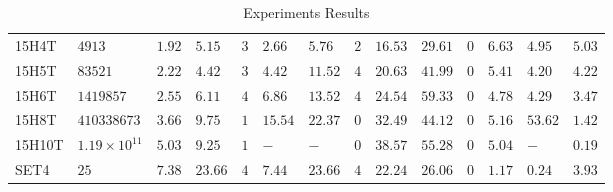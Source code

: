 \begin{center}
\begin{table}[]
\begin{adjustwidth}{-1in}{-1in}
\begin{tabular}{|ll|lll|lll|lll|lll|}
15H4T & $4913             $ & $1.92$ & $5.15 $ & $3 $  & $2.66 $ & $5.76 $ & $2 $  & $16.53$  & $29.61$  & $0$   & $6.63 $ & $4.95 $ & $5.03 $ \\
15H5T & $83521            $ & $2.22$ & $4.42 $ & $3 $  & $4.42 $ & $11.52$ & $4 $  & $20.63$  & $41.99$  & $0$   & $5.41 $ & $4.20 $ & $4.22 $ \\
15H6T & $1419857          $ & $2.55$ & $6.11 $ & $4 $  & $6.86 $ & $13.52$ & $4 $  & $24.54$  & $59.33$  & $0$   & $4.78 $ & $4.29 $ & $3.47 $ \\
15H8T & $410338673        $ & $3.66$ & $9.75 $ & $1 $  & $15.54$ & $22.37$ & $0 $  & $32.49$  & $44.12$  & $0$   & $5.16 $ & $53.62$ & $1.42 $ \\
15H10T& $1.19\times10^{11}$ & $5.03$ & $9.25 $ & $1 $  & $-    $ & $-    $ & $0 $  & $38.57$  & $55.28$  & $0$   & $5.04 $ & $-    $ & $0.19 $ \\
SET4  & $25               $ & $7.38$ & $23.66$ & $4 $  & $7.44 $ & $23.66$ & $4 $  & $22.24$  & $26.06$  & $0$   & $1.17 $ & $0.24 $ & $3.93 $ \\
\hline
    \end{tabular}
    \end{adjustwidth}
    \caption{Experiments Results}
    \label{results}
    \end{table}
\end{center}